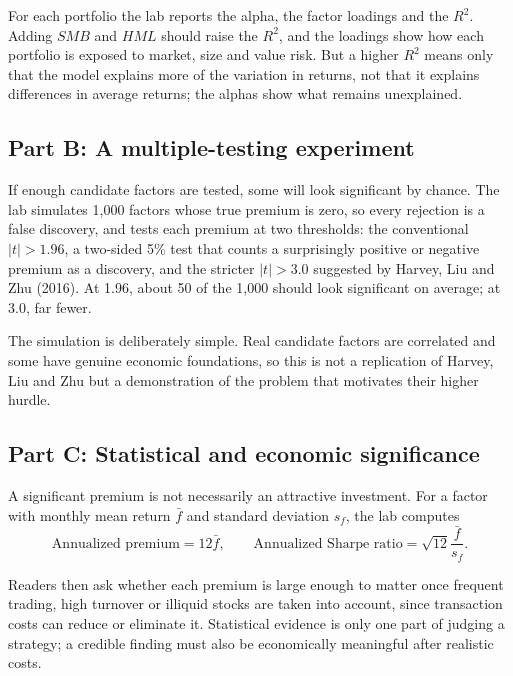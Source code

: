 For each portfolio the lab reports the alpha, the factor loadings and the $R^2$. Adding $SMB$ and $HML$ should raise the $R^2$, and the loadings show how each portfolio is exposed to market, size and value risk. But a higher $R^2$ means only that the model explains more of the variation in returns, not that it explains differences in average returns; the alphas show what remains unexplained.

\subsection*{Part B: A multiple-testing experiment}

If enough candidate factors are tested, some will look significant by chance. The lab simulates 1,000 factors whose true premium is zero, so every rejection is a false discovery, and tests each premium at two thresholds: the conventional $|t|>1.96$, a two-sided 5\% test that counts a surprisingly positive or negative premium as a discovery, and the stricter $|t|>3.0$ suggested by Harvey, Liu and Zhu (2016). At 1.96, about 50 of the 1,000 should look significant on average; at 3.0, far fewer.

The simulation is deliberately simple. Real candidate factors are correlated and some have genuine economic foundations, so this is not a replication of Harvey, Liu and Zhu but a demonstration of the problem that motivates their higher hurdle.

\subsection*{Part C: Statistical and economic significance}

A significant premium is not necessarily an attractive investment. For a factor with monthly mean return $\bar{f}$ and standard deviation $s_f$, the lab computes
\begin{equation}
  \text{Annualized premium}=12\bar{f},
  \qquad
  \text{Annualized Sharpe ratio}
  =\sqrt{12}\frac{\bar{f}}{s_f}.
  \label{eq:04-lab-sharpe}
\end{equation}

Readers then ask whether each premium is large enough to matter once frequent trading, high turnover or illiquid stocks are taken into account, since transaction costs can reduce or eliminate it. Statistical evidence is only one part of judging a strategy; a credible finding must also be economically meaningful after realistic costs.

